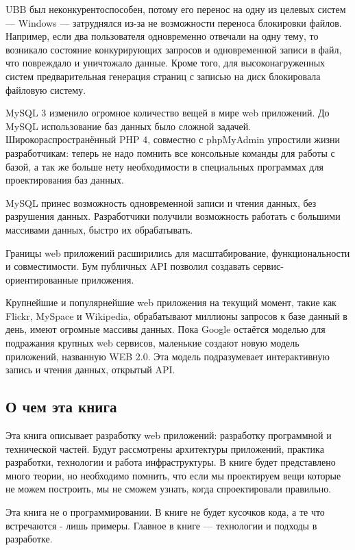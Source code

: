 UBB был неконкурентоспособен, потому его перенос на одну из целевых систем --- Windows --- затруднялся из-за не возможности переноса блокировки файлов. Например, если два пользователя одновременно отвечали на одну тему, то возникало состояние конкурирующих запросов и одновременной записи в файл, что повреждало и уничтожало данные. Кроме того, для высоконагруженных систем предварительная генерация страниц  с записью на диск блокировала файловую систему.


MySQL 3 изменило огромное количество вещей в мире web приложений. До MySQL использование баз данных было сложной задачей. Широкораспространённый PHP 4, совместно с phpMyAdmin упростили жизни разработчикам: теперь не надо помнить все консольные команды для работы с базой, а так же больше нету необходимости в специальных программах для проектирования баз данных.

MySQL принес возможность одновременной записи и чтения данных, без разрушения данных. Разработчики получили возможность работать с большими массивами данных, быстро их обрабатывать.

Границы web приложений расширились для масштабирование, функциональности и совместимости. Бум публичных API позволил создавать сервис-ориентированные приложения.

Крупнейшие и популярнейшие web приложения на текущий момент, такие как  Flickr, MySpace и Wikipedia, обрабатывают миллионы запросов к базе данный в день, имеют огромные массивы данных. Пока Google остаётся моделью для подражания крупных web сервисов, маленькие создают новую модель приложений, названную WEB 2.0. Эта модель подразумевает интерактивную запись и чтения данных, открытый API.

\subsection{О чем эта книга} \label{subsect1_1_2}

Эта книга описывает разработку web приложений: разработку программной и технической частей. Будут рассмотрены архитектуры приложений, практика разработки, технологии и работа инфраструктуры. В книге будет представлено много теории, но необходимо помнить, что если мы проектируем вещи которые не можем построить, мы не сможем узнать, когда спроектировали правильно.


Эта книга не о программировании. В книге не будет кусочков кода, а те что встречаются - лишь примеры. Главное в книге --- технологии и подходы в разработке.

